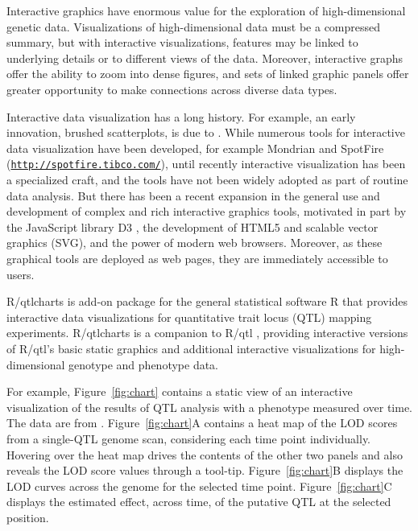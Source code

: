 \documentclass[12pt,letterpaper]{article}
\begin{document}
\newpage

Interactive graphics have enormous value for the exploration of
high-dimensional genetic data. Visualizations of high-dimensional data
must be a compressed summary, but with interactive visualizations,
features may be linked to underlying details or to different views of
the data. Moreover, interactive graphs offer
the ability to zoom into dense figures, and sets
of linked graphic panels offer greater opportunity to make
connections across diverse data types.

Interactive data visualization has a long history. For example, an
early innovation, brushed scatterplots, is due to \citet{Becker1987}.
While numerous tools for interactive data visualization have been
developed, for example Mondrian
\citep[\href{http://www.theusrus.de/Mondrian}{\tt \small http://www.theusrus.de/Mondrian}]{Theus2008}
and SpotFire (\href{http://spotfire.tibco.com/}{\tt \small http://spotfire.tibco.com/}),
until recently interactive visualization has been a specialized craft,
and the tools have not been widely adopted as part of routine data
analysis. But there has been a recent expansion in the general use and
development of complex and rich interactive graphics tools, motivated
in part by the JavaScript library D3
\citep[\href{http://d3js.org}{\tt \small http://d3js.org}]{Bostock2011},
the development of HTML5 and scalable vector graphics (SVG), and the
power of modern web browsers. Moreover, as these graphical tools are
deployed as web pages, they are immediately accessible to users.

R/qtlcharts is add-on package for the general statistical software R
\citep{R} that provides interactive data visualizations for
quantitative trait locus (QTL) mapping experiments. R/qtlcharts is a
companion to R/qtl \citep{Broman2003}, providing interactive versions
of R/qtl's basic static graphics and additional interactive
visualizations for high-dimensional genotype and phenotype data.

For example, Figure~\ref{fig:chart} contains a static view of an
interactive visualization of the results of QTL analysis with a
phenotype measured over time. The data are from
\citet{Moore2013}. Figure~\ref{fig:chart}A contains a heat map of the
LOD scores from a single-QTL genome scan, considering each time point
individually. Hovering over the heat map drives the contents of the
other two panels and also reveals the LOD score values through a
tool-tip. Figure~\ref{fig:chart}B displays the LOD curves across
the genome for the selected time point. Figure~\ref{fig:chart}C
displays the estimated effect, across time, of the putative QTL at the
selected position.
\end{document}
